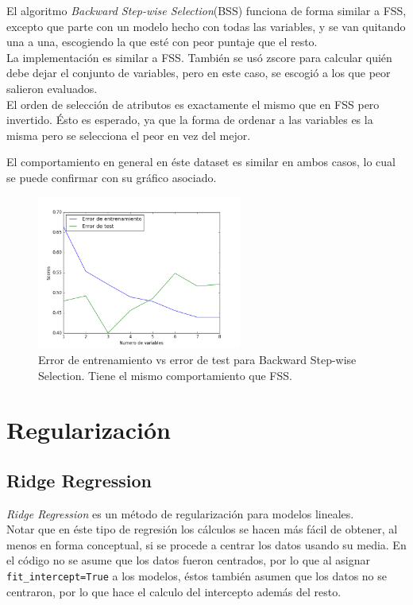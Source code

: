 \documentclass[letter, 10pt]{article}
\begin{document}
El algoritmo \textit{Backward Step-wise Selection}(BSS) funciona de forma
similar a FSS, excepto que parte con un modelo hecho con todas las variables, y
se van quitando una a una, escogiendo la que esté con peor puntaje que el resto.\\

La implementación es similar a FSS. También se usó zscore para calcular quién
debe dejar el conjunto de variables, pero en este caso, se escogió a los que
peor salieron evaluados.\\


El orden de selección de atributos es exactamente el mismo que en FSS pero
invertido. Ésto es esperado, ya que la forma de ordenar a las variables es la
misma pero se selecciona el peor en vez del mejor.

El comportamiento en general en éste dataset es similar en ambos casos, lo cual
se puede confirmar con su gráfico asociado.

\begin{figure}[H]
  \centering
 \includegraphics[width=0.6\textwidth]{Images/p2_fig2.png} 
  \caption{Error de entrenamiento vs error de test para Backward Step-wise
    Selection. Tiene el mismo comportamiento que FSS.}
  \label{fig:p2_g2}
\end{figure}
\section{Regularización}

\subsection{Ridge Regression}
\textit{Ridge Regression} es un método de regularización para modelos
lineales.\\

Notar que en éste tipo de regresión los cálculos se hacen más fácil de obtener,
al menos en forma conceptual, si se procede a centrar los datos usando su media.
En el código no se asume que los datos fueron centrados, por lo que al asignar
\texttt{fit\_intercept=True} a los modelos, éstos también asumen que los datos no
se centraron, por lo que hace el calculo del intercepto además del resto.
\end{document}
